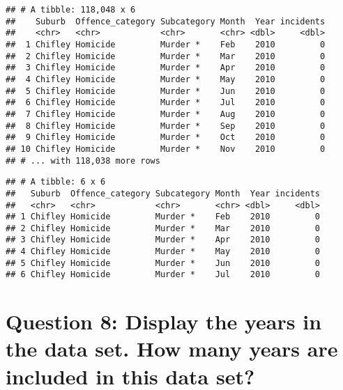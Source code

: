 \documentclass[
]{article}
\newenvironment{Shaded}{\begin{snugshade}}{\end{snugshade}}
\newcommand{\CommentTok}[1]{\textcolor[rgb]{0.56,0.35,0.01}{\textit{#1}}}
\newcommand{\DataTypeTok}[1]{\textcolor[rgb]{0.13,0.29,0.53}{#1}}
\newcommand{\KeywordTok}[1]{\textcolor[rgb]{0.13,0.29,0.53}{\textbf{#1}}}
\newcommand{\NormalTok}[1]{#1}
\newcommand{\OperatorTok}[1]{\textcolor[rgb]{0.81,0.36,0.00}{\textbf{#1}}}
\newcommand{\StringTok}[1]{\textcolor[rgb]{0.31,0.60,0.02}{#1}}
\begin{document}
\begin{verbatim}
## # A tibble: 118,048 x 6
##    Suburb  Offence_category Subcategory Month  Year incidents
##    <chr>   <chr>            <chr>       <chr> <dbl>     <dbl>
##  1 Chifley Homicide         Murder *    Feb    2010         0
##  2 Chifley Homicide         Murder *    Mar    2010         0
##  3 Chifley Homicide         Murder *    Apr    2010         0
##  4 Chifley Homicide         Murder *    May    2010         0
##  5 Chifley Homicide         Murder *    Jun    2010         0
##  6 Chifley Homicide         Murder *    Jul    2010         0
##  7 Chifley Homicide         Murder *    Aug    2010         0
##  8 Chifley Homicide         Murder *    Sep    2010         0
##  9 Chifley Homicide         Murder *    Oct    2010         0
## 10 Chifley Homicide         Murder *    Nov    2010         0
## # ... with 118,038 more rows
\end{verbatim}

\begin{Shaded}
\end{Shaded}

\begin{verbatim}
## # A tibble: 6 x 6
##   Suburb  Offence_category Subcategory Month  Year incidents
##   <chr>   <chr>            <chr>       <chr> <dbl>     <dbl>
## 1 Chifley Homicide         Murder *    Feb    2010         0
## 2 Chifley Homicide         Murder *    Mar    2010         0
## 3 Chifley Homicide         Murder *    Apr    2010         0
## 4 Chifley Homicide         Murder *    May    2010         0
## 5 Chifley Homicide         Murder *    Jun    2010         0
## 6 Chifley Homicide         Murder *    Jul    2010         0
\end{verbatim}

\hypertarget{question-8-display-the-years-in-the-data-set.-how-many-years-are-included-in-this-data-set}{%
\section{Question 8: Display the years in the data set. How many years
are included in this data
set?}\label{question-8-display-the-years-in-the-data-set.-how-many-years-are-included-in-this-data-set}}
\end{document}
